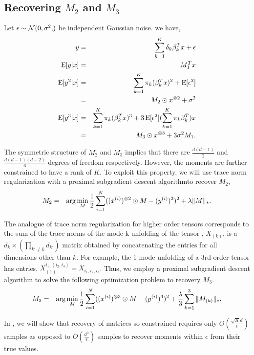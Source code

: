 \subsection{Recovering $M_2$ and $M_3$}

Let $\epsilon \sim \normal{0, \sigma^2}$ be independent Gaussian noise.
we have,
\begin{eqnarray*}
  y &=& \sum_{k=1}^{K} \delta_{k} \beta_k^T x + \epsilon \\
  \operatorname{E}[ y | x ] &=& M_1^T x \\
  \operatorname{E}[ y^2 | x ] &=& \sum_{k=1}^{K} \pi_{k} (\beta_k^T x)^2 + \operatorname{E}[ \epsilon^2 ] \\
  &=& M_2 \odot x^{\otimes 2} + \sigma^2 \\
  \operatorname{E}[ y^3 | x ] &=& \sum_{k=1}^{K} \pi_{k} (\beta_k^T x)^3
            + 3 \operatorname{E}[\epsilon^2] (\sum_{k=1}^{K} \pi_{k} \beta_k^T) x \\
  &=& M_3 \odot x^{\otimes 3} + 3 \sigma^2 M_1.
\end{eqnarray*}

The symmetric structure of $M_2$ and $M_3$ implies that there are
$\frac{d (d-1)}{2}$ and $\frac{d (d-1) (d-2)}{6}$ degrees of freedom
respectively. However, the moments are further constrained to have
a rank of $K$. To exploit this property, we will use trace norm
regularization with a proximal subgradient descent
algorithm\citationneeded to recover $M_2$,
\begin{eqnarray*}
  M_2 &=& \arg\min_{M} \frac{1}{2} \sum_{i=1}^N ((x^{(i)})^{\otimes 2} \odot M - (y^{(i)})^2)^2 + \lambda \|M\|_*.
\end{eqnarray*}

The analogue of trace norm regularization for higher order tensors
corresponds to the sum of the trace norms of the mode-k unfolding of the
tensor \cite{Tomioka2011}, $X_{(k)}$, is a $d_k \times (\prod_{k' \neq
k} d_{k'})$ matrix obtained by concatenating the entries for all
dimensions other than $k$. For example, the 1-mode unfolding of a 3rd
order tensor has entries, $X_{(1)}^{i_1, (i_2, i_3)} = X_{i_1, i_2,
i_3}$. Thus, we employ a proximal subgradient descent algorithm to solve
the following optimization problem to recovery $M_3$.
\begin{eqnarray*}
  M_3 &=& \arg\min_{M} \frac{1}{2} \sum_{i=1}^N ((x^{(i)})^{\otimes 3} \odot M - (y^{(i)})^3)^2 
          + \frac{\lambda}{3} \sum_{k=1}^{3} \|M_{(k)}\|_*.
\end{eqnarray*}

In , we will show that recovery of matrices so
constrained requires only $O(\frac{\sqrt{K} d}{\epsilon})$ samples as
opposed to $O(\frac{d^3}{\epsilon})$ samples to recover moments within
$\epsilon$ from their true values.

